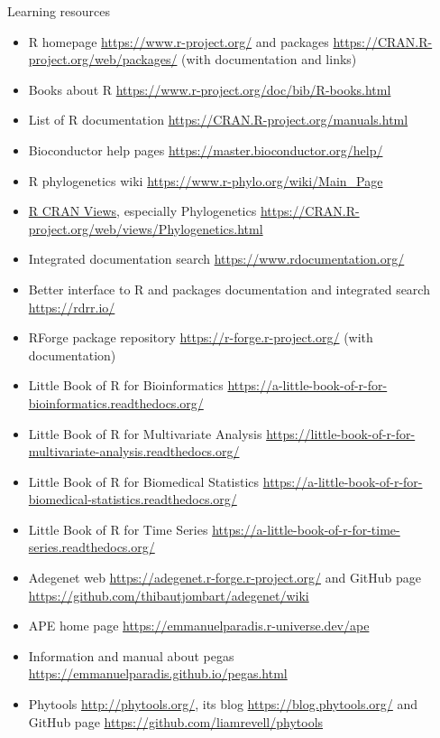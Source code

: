 \documentclass[compress, xelatex, 11pt, xcolor=svgnames, aspectratio=169, url={hyphens, lowtilde}]{beamer}
\begin{document}
\begin{frame}[allowframebreaks]{Learning resources}
	\begin{itemize}
		\item R homepage \url{https://www.r-project.org/} and packages \url{https://CRAN.R-project.org/web/packages/} (with documentation and links)
		\item Books about R \url{https://www.r-project.org/doc/bib/R-books.html}
		\item List of R documentation \url{https://CRAN.R-project.org/manuals.html}
		\item Bioconductor help pages \url{https://master.bioconductor.org/help/}
		\item R phylogenetics wiki \url{https://www.r-phylo.org/wiki/Main_Page}
		\item \href{https://cran.r-project.org/web/views/}{R CRAN Views}, especially Phylogenetics \url{https://CRAN.R-project.org/web/views/Phylogenetics.html}
		\item Integrated documentation search \url{https://www.rdocumentation.org/}
		\item Better interface to R and packages documentation and integrated search \url{https://rdrr.io/}
		\item RForge package repository \url{https://r-forge.r-project.org/} (with documentation)
		\item Little Book of R for Bioinformatics \url{https://a-little-book-of-r-for-bioinformatics.readthedocs.org/}
		\item Little Book of R for Multivariate Analysis \url{https://little-book-of-r-for-multivariate-analysis.readthedocs.org/}
		\item Little Book of R for Biomedical Statistics \url{https://a-little-book-of-r-for-biomedical-statistics.readthedocs.org/}
		\item Little Book of R for Time Series \url{https://a-little-book-of-r-for-time-series.readthedocs.org/}
		\item Adegenet web \url{https://adegenet.r-forge.r-project.org/} and GitHub page \url{https://github.com/thibautjombart/adegenet/wiki}
		\item APE home page \url{https://emmanuelparadis.r-universe.dev/ape}
		\item Information and manual about pegas \url{https://emmanuelparadis.github.io/pegas.html}
		\item Phytools \url{http://phytools.org/}, its blog \url{https://blog.phytools.org/} and GitHub page \url{https://github.com/liamrevell/phytools}

\end{itemize}
\end{frame}
\end{document}
